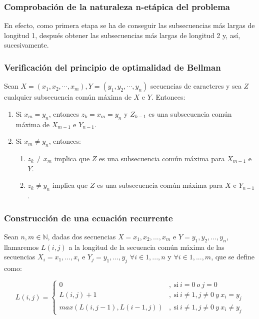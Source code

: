 \documentclass[13pt]{beamer}
\begin{document}
    \begin{frame}
		\frametitle{Comprobación de la naturaleza n-etápica del problema}
        En efecto, como primera etapa se ha de conseguir las subsecuencias más largas de longitud 1, 
        después obtener las subsecuencias más largas de longitud 2 y, así, sucesivamente. 
	\end{frame}

    \begin{frame}
		\frametitle{Verificación del principio de optimalidad de Bellman}
        \begin{theorem}
            Sean $X=(x_1,x_2,\cdots, x_m),Y=(y_1,y_2, \cdots, y_n)$ secuencias de caracteres 
            y sea $Z$ cualquier subsecuencia común máxima 
            de $X$ e $Y$. Entonces:
            \begin{enumerate}
              \item Si $x_m = y_n$, entonces $z_k = x_m = y_n$ y $Z_{k-1}$ es una subsecuencia
              común máxima de $X_{m-1}$ e $Y_{n-1}$. 
              \item Si $x_m \neq y_n$, entonces:
              \begin{enumerate}
                \item $z_k \neq x_m$ implica que $Z$ es una subsecuencia común máxima para $X_{m-1}$ e $Y$. 
                \item $z_k \neq y_n$ implica que $Z$ es una subsecuencia común máxima para $X$ e $Y_{n-1}$. 
              \end{enumerate}
            \end{enumerate}
        \end{theorem}
	\end{frame}

    \begin{frame}
		\frametitle{Construcción de una ecuación recurrente}
        Sean $n,m \in \mathbb{N}$, dadas dos secuencias $X = { x_1,x_2,...,x_m}$ e $Y = { y_1,y_2,...,y_n}$, llamaremos $L(i,j)$ a la 
        longitud de la secuencia común máxima de las secuencias $X_i = {x_1,...,x_i}$ e $Y_j = {y_1,...,y_j}$ $\forall i \in {1,...,n} $ y $\forall i \in {1,...,m}$, 
        que se define como:  

        \[
        L(i,j) = 
        \left \{
            \begin{aligned}
            0 &,\ \text{si} \ i = 0 \ o \ j = 0\\
            L(i,j) + 1 &,\ \text{si} \ i \neq  1 , j \neq  0 \ y \ x_i = y_j\\
            max(L(i,j-1) , L(i-1,j))&,\ \text{si} \ i \neq 1 , j \neq 0 \ y \ x_i \neq y_j
            \end{aligned}
        \right .
        \]
	\end{frame}
\end{document}
